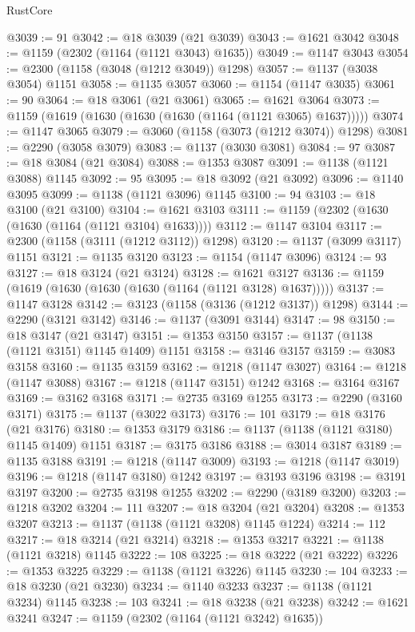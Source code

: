 \begin{lexlean}{RustCore}
\begin{coremodule}
@3039 := 91
@3042 := @18 @3039 (@21 @3039)
@3043 := @1621 @3042
@3048 := @1159 (@2302 (@1164 (@1121 @3043) @1635))
@3049 := @1147 @3043
@3054 := @2300 (@1158 (@3048 (@1212 @3049)) @1298)
@3057 := @1137 (@3038 @3054) @1151
@3058 := @1135 @3057
@3060 := @1154 (@1147 @3035)
@3061 := 90
@3064 := @18 @3061 (@21 @3061)
@3065 := @1621 @3064
@3073 := @1159 (@1619 (@1630 (@1630 (@1630 (@1164 (@1121 @3065) @1637)))))
@3074 := @1147 @3065
@3079 := @3060 (@1158 (@3073 (@1212 @3074)) @1298)
@3081 := @2290 (@3058 @3079)
@3083 := @1137 (@3030 @3081)
@3084 := 97
@3087 := @18 @3084 (@21 @3084)
@3088 := @1353 @3087
@3091 := @1138 (@1121 @3088) @1145
@3092 := 95
@3095 := @18 @3092 (@21 @3092)
@3096 := @1140 @3095
@3099 := @1138 (@1121 @3096) @1145
@3100 := 94
@3103 := @18 @3100 (@21 @3100)
@3104 := @1621 @3103
@3111 := @1159 (@2302 (@1630 (@1630 (@1164 (@1121 @3104) @1633))))
@3112 := @1147 @3104
@3117 := @2300 (@1158 (@3111 (@1212 @3112)) @1298)
@3120 := @1137 (@3099 @3117) @1151
@3121 := @1135 @3120
@3123 := @1154 (@1147 @3096)
@3124 := 93
@3127 := @18 @3124 (@21 @3124)
@3128 := @1621 @3127
@3136 := @1159 (@1619 (@1630 (@1630 (@1630 (@1164 (@1121 @3128) @1637)))))
@3137 := @1147 @3128
@3142 := @3123 (@1158 (@3136 (@1212 @3137)) @1298)
@3144 := @2290 (@3121 @3142)
@3146 := @1137 (@3091 @3144)
@3147 := 98
@3150 := @18 @3147 (@21 @3147)
@3151 := @1353 @3150
@3157 := @1137 (@1138 (@1121 @3151) @1145 @1409) @1151
@3158 := @3146 @3157
@3159 := @3083 @3158
@3160 := @1135 @3159
@3162 := @1218 (@1147 @3027)
@3164 := @1218 (@1147 @3088)
@3167 := @1218 (@1147 @3151) @1242
@3168 := @3164 @3167
@3169 := @3162 @3168
@3171 := @2735 @3169 @1255
@3173 := @2290 (@3160 @3171)
@3175 := @1137 (@3022 @3173)
@3176 := 101
@3179 := @18 @3176 (@21 @3176)
@3180 := @1353 @3179
@3186 := @1137 (@1138 (@1121 @3180) @1145 @1409) @1151
@3187 := @3175 @3186
@3188 := @3014 @3187
@3189 := @1135 @3188
@3191 := @1218 (@1147 @3009)
@3193 := @1218 (@1147 @3019)
@3196 := @1218 (@1147 @3180) @1242
@3197 := @3193 @3196
@3198 := @3191 @3197
@3200 := @2735 @3198 @1255
@3202 := @2290 (@3189 @3200)
@3203 := @1218 @3202
@3204 := 111
@3207 := @18 @3204 (@21 @3204)
@3208 := @1353 @3207
@3213 := @1137 (@1138 (@1121 @3208) @1145 @1224)
@3214 := 112
@3217 := @18 @3214 (@21 @3214)
@3218 := @1353 @3217
@3221 := @1138 (@1121 @3218) @1145
@3222 := 108
@3225 := @18 @3222 (@21 @3222)
@3226 := @1353 @3225
@3229 := @1138 (@1121 @3226) @1145
@3230 := 104
@3233 := @18 @3230 (@21 @3230)
@3234 := @1140 @3233
@3237 := @1138 (@1121 @3234) @1145
@3238 := 103
@3241 := @18 @3238 (@21 @3238)
@3242 := @1621 @3241
@3247 := @1159 (@2302 (@1164 (@1121 @3242) @1635))

\end{coremodule}
\end{lexlean}
